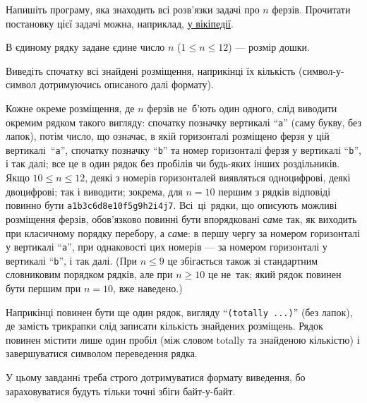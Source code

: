 ﻿Напишіть програму, яка знаходить всі розв'язки задачі про $n$ ферзів. Прочитати постановку цієї задачі можна, наприклад, \href{https://uk.wikipedia.org/wiki/%D0%97%D0%B0%D0%B4%D0%B0%D1%87%D0%B0_%D0%BF%D1%80%D0%BE_%D0%B2%D1%96%D1%81%D1%96%D0%BC_%D1%84%D0%B5%D1%80%D0%B7%D1%96%D0%B2}{у вікіпедії}.

\InputFile
В єдиному рядку задане єдине число $n$ ($1\leqslant n\leqslant 12$) --- розмір дошки.

\OutputFile
Виведіть спочатку всі знайдені розміщення, наприкінці їх кількість (символ-у-символ дотримуючись описаного далі формату).

Кожне окреме розміщення, де $n$ ферзів не~б'ють один одного, слід виводити окремим рядком такого вигляду: спочатку позначку вертикалі ``{\tt a}'' (саму букву, без лапок), потім число, що означає, в якій горизонталі розміщено ферзя у цій вертикалі~``{\tt a}'', спочатку позначку ``{\tt b}'' та номер горизонталі ферзя у вертикалі ``{\tt b}'', і так далі; все це в один рядок без пробілів чи будь-яких інших роздільників. Якщо $10\leqslant n\leqslant 12$, деякі з номерів горизонталей виявляться одноцифрові, деякі двоцифрові; так і виводити; зокрема, для $n=10$ першим з рядків відповіді повинно бути {\tt a1b3c6d8e10f5g9h2i4j7}. Всі~ці~рядки, що описують можливі розміщення ферзів, обов'язково повинні бути впорядковані с{\it а}ме так, як виходить при класичному порядку перебору, а с{\it а}ме: в першу чергу за номером горизонталі у вертикалі ``{\tt a}'', при однаковості цих номерів --- за номером горизонталі у вертикалі ``{\tt b}'', і так далі. (При $n\leqslant 9$ це збігається також зі стандартним словниковим порядком рядків, але при $n\geqslant 10$ це не~так; який рядок повинен бути першим при $n=10$, вже наведено.)

Наприкінці повинен бути ще один рядок, вигляду ``{\tt (totally ...)}'' (без лапок), де замість трикрапки слід записати кількість знайдених розміщень. Рядок повинен містити лише один пробіл (між словом totally та знайденою кількістю) і завершуватися символом переведення рядка.

\Examples
\begin{example}
\end{example}

\Note
У цьому завданнi треба строго дотримуватися формату виведення, бо зараховуватися будуть тільки точні збіги байт-у-байт. 